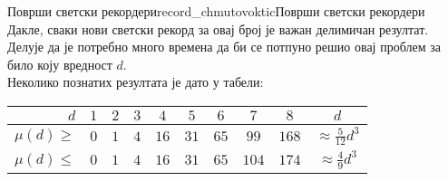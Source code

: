 \begin{surferIntroPage}{Површи светски рекордери}{record_chmutovoktic}{Површи светски рекордери}
    Дакле, сваки нови светски рекорд за овај број је важан делимичан резултат. 
	Делује да је потребно много времена да би се потпуно решио овај проблем за било 
	коју вредност  $d$.\\  
	Неколико познатих резултата је дато у табели:
   \begin{center}
      \begin{tabular}{r|cccccccc|c}
        $d$ & $1$ & $2$ & $3$ & $4$ & $5$ & $6$ & $7$ & $8$ & $d$\\
        \hline
        \hline
        \rule{0pt}{1.2em}$\mu(d)\ge$ & $0$ & $1$ & $4$ & $16$ & $31$ & $65$ &
        $99$ & $168$ & 
        $\approx \frac{5}{12}d^3$\\[0.3em]
        \hline
        \rule{0pt}{1.2em}$\mu(d)\le$ & $0$ & $1$ & $4$ & $16$ & $31$ & $65$ &
        $104$ & $174$ & $\approx \frac{4}{9}d^3$
      \end{tabular}
    \end{center}
\end{surferIntroPage}
